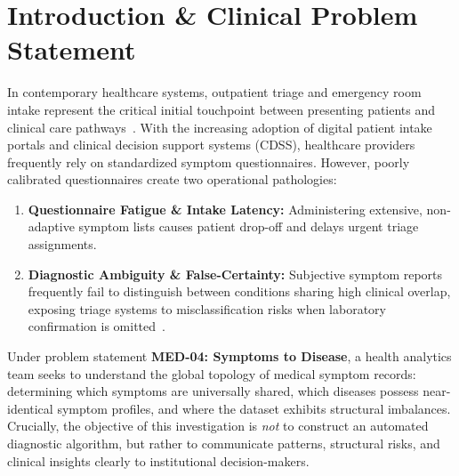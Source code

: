 \documentclass[conference]{IEEEtran}
\begin{document}
\section{Introduction \& Clinical Problem Statement}
In contemporary healthcare systems, outpatient triage and emergency room intake represent the critical initial touchpoint between presenting patients and clinical care pathways~\cite{gilboy2011emergency}. With the increasing adoption of digital patient intake portals and clinical decision support systems (CDSS), healthcare providers frequently rely on standardized symptom questionnaires. However, poorly calibrated questionnaires create two operational pathologies:
\begin{enumerate}[noitemsep]
    \item \textbf{Questionnaire Fatigue \& Intake Latency:} Administering extensive, non-adaptive symptom lists causes patient drop-off and delays urgent triage assignments.
    \item \textbf{Diagnostic Ambiguity \& False-Certainty:} Subjective symptom reports frequently fail to distinguish between conditions sharing high clinical overlap, exposing triage systems to misclassification risks when laboratory confirmation is omitted~\cite{cabitza2017unintended}.
\end{enumerate}

Under problem statement \textbf{MED-04: Symptoms to Disease}, a health analytics team seeks to understand the global topology of medical symptom records: determining which symptoms are universally shared, which diseases possess near-identical symptom profiles, and where the dataset exhibits structural imbalances. Crucially, the objective of this investigation is \textit{not} to construct an automated diagnostic algorithm, but rather to communicate patterns, structural risks, and clinical insights clearly to institutional decision-makers.
\end{document}
